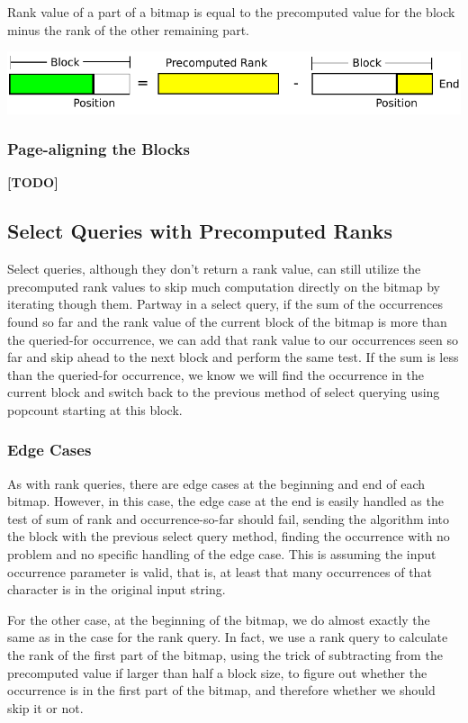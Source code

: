 \figureBegin
\caption{Rank value of a part of a bitmap is equal to the precomputed value for the block minus the rank of the other remaining part.}
\label{fig:PrecomputePopcountBlock}
\includegraphics[width=\textwidth]{PrecomputePopcountBlock.pdf}
\figureEnd



\subsubsection{Page-aligning the Blocks}
\textbf{[TODO]}

\subsection{Select Queries with Precomputed Ranks}
Select queries, although they don't return a rank value, can still utilize the precomputed rank values to skip much computation directly on the bitmap by iterating though them.
Partway in a select query, if the sum of the occurrences found so far and the rank value of the current block of the bitmap is more than the queried-for occurrence, we can add that rank value to our occurrences seen so far and skip ahead to the next block and perform the same test.
If the sum is less than the queried-for occurrence, we know we will find the occurrence in the current block and switch back to the previous method of select querying using popcount starting at this block.


\subsubsection{Edge Cases}
As with rank queries, there are edge cases at the beginning and end of each bitmap.
However, in this case, the edge case at the end is easily handled as the test of sum of rank and occurrence-so-far should fail, sending the algorithm into the block with the previous select query method, finding the occurrence with no problem and no specific handling of the edge case.
This is assuming the input occurrence parameter is valid, that is, at least that many occurrences of that character is in the original input string.

For the other case, at the beginning of the bitmap, we do almost exactly the same as in the case for the rank query.
In fact, we use a rank query to calculate the rank of the first part of the bitmap, using the trick of subtracting from the precomputed value if larger than half a block size, to figure out whether the occurrence is in the first part of the bitmap, and therefore whether we should skip it or not.

